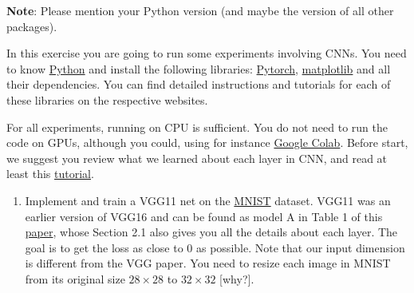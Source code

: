 \documentclass[10pt]{article}
\newcommand{\blue}[1]{{\color{blue}#1}}
\newcommand{\magenta}[1]{{\color{magenta}#1}}
\begin{document}
\newpage
\begin{exercise}
	\blue{\textbf{Note}: Please mention your Python version (and maybe the version of all other packages).}

	In this exercise you are going to run some experiments involving CNNs. You need to know \href{https://www.python.org/}{\magenta{Python}} and install the following libraries: \href{https://pytorch.org/get-started/locally/}{\magenta{Pytorch}}, \href{https://matplotlib.org/}{\magenta{matplotlib}} and all their dependencies. You can find detailed instructions and tutorials for each of these libraries on the respective websites.

	For all experiments, running on CPU is sufficient. You do not need to run the code on GPUs, although you could, using for instance \href{https://colab.research.google.com/}{Google Colab}.
	Before start, we suggest you review what we learned about each layer in CNN, and read at least this \href{https://pytorch.org/tutorials/beginner/blitz/neural_networks_tutorial.html}{\magenta{tutorial}}.

	\begin{enumerate}
		\item Implement and train a VGG11 net on the \href{https://pytorch.org/vision/stable/datasets.html#mnist}{\magenta{MNIST}} dataset.
		      VGG11 was an earlier version of VGG16 and can be found as model A in Table 1 of this \href{https://arxiv.org/pdf/1409.1556.pdf}{\magenta{paper}}, whose Section 2.1 also gives you all the details about each layer.
		      The goal is to get the loss as close to 0 as possible. Note that our input dimension is different from the VGG paper. You need to resize each image in MNIST from its original size $28 \times 28$ to $32 \times 32$ [why?].


\end{enumerate}
\end{exercise}
\end{document}
